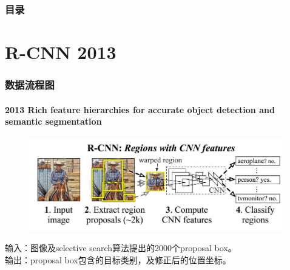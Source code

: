 \documentclass{beamer}
\date{2017 11}
\begin{document}

\begin{frame}
    \frametitle{目录}
    \tableofcontents
\end{frame}


\section{R-CNN 2013}

\begin{frame}
    \frametitle{数据流程图}
    \framesubtitle{2013 Rich feature hierarchies for accurate object detection and semantic segmentation}
    \begin{figure}
        \centering
        \includegraphics[height=4cm]{graphic/rcnnflow.jpg}
    \end{figure}
    输入：图像及selective search算法提出的2000个proposal box。  \\
    输出：proposal box包含的目标类别，及修正后的位置坐标。  \\
\end{frame}
\end{document}
